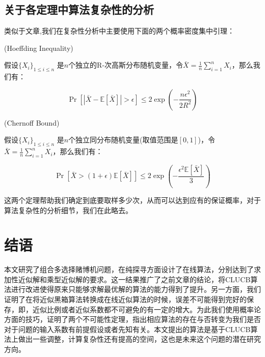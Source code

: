 \documentclass[bachelor]{thuthesis}
\begin{document}
\section{关于各定理中算法复杂性的分析}

类似于文章\cite{cpemab},我们在复杂性分析中主要使用下面的两个概率密度集中引理：

\begin{lemma}(Hoeffding Inequality)

假设$\{X_i\}_{1\le i\le n}$ 是$n$个独立的R-次高斯分布随机变量，令$\bar{X}=\frac{1}{n}\sum_{i=1}^{n}X_i$，那么我们有：

\[\Pr\left[|\bar{X}-\mathbb{E}[\bar{X}]|>\epsilon\right]\le 2\exp(-\frac{n\epsilon^2}{2R^2})\]

\end{lemma}


\begin{lemma}(Chernoff Bound)

假设$\{X_i\}_{1\le i\le n}$ 是$n$个独立同分布随机变量(取值范围是$[0,1]$)，令$\bar{X}=\frac{1}{n}\sum_{i=1}^{n}X_i$，那么我们有：

\[\Pr\left[\bar{X}>(1+\epsilon)\mathbb{E}[\bar{X}]\right]\le 2\exp(-\frac{\epsilon^2\mathbb{E}[\bar{X}]}{3})\]

\end{lemma}

这两个定理帮助我们确定到底要取样多少次，从而可以达到应有的保证概率，对于算法复杂性的分析细节，我们在此略去。




\chapter{结语}
\label{cha:china}

本文研究了组合多选择赌博机问题，在纯探寻方面设计了在线算法，分别达到了求加性近似解和乘型近似解的要求。这一结果推广了之前\cite{cpemab}文章的结论，将CLUCB算法进行改进使得原来只能够求解最优解的算法的能力得到了提升。另一方面，我们证明了在将近似黑箱算法转换成在线近似算法的时候，误差不可能得到完好的保存，即，近似比例或者近似系数都不可避免的有一定的增大。为此我们使用概率论方面的技巧，证明了两个不可能性定理，指出相应算法的存在与否转变为我们是否对于问题的输入系数有前提假设或者先知有关。本文提出的算法是基于CLUCB算法上做出一些调整，计算复杂性还有提高的空间，这也是未来这个问题的潜在研究方向。
\end{document}
